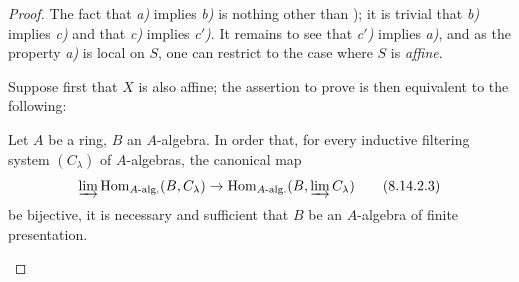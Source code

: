 \begin{proof}
The fact that \emph{a)} implies \emph{b)} is nothing other than ); it is trivial that \emph{b)} implies \emph{c)} and that \emph{c)} implies \emph{c$'$)}.
It remains to see that \emph{c$'$)} implies \emph{a)}, and as the property \emph{a)} is local on $S$, one can restrict to the case where $S$ is \emph{affine}.

Suppose first that $X$ is also affine; the assertion to prove is then equivalent to the following:

\begin{corollary}[8.14.2.2]
\label{IV.8.14.2.2}
Let $A$ be a ring, $B$ an $A$-algebra.
In order that, for every inductive filtering system $(C_\lambda)$ of $A$-algebras, the canonical map
\begin{equation}
\label{IV.8.14.2.3}
\varinjlim\operatorname{Hom}_{A\text{-}\mathrm{alg.}}(B,C_\lambda)\to\operatorname{Hom}_{A\text{-}\mathrm{alg.}}(B,\varinjlim C_\lambda) \tag{8.14.2.3}
\end{equation}
be bijective, it is necessary and sufficient that $B$ be an $A$-algebra of finite presentation.
\end{corollary}


\end{proof}
